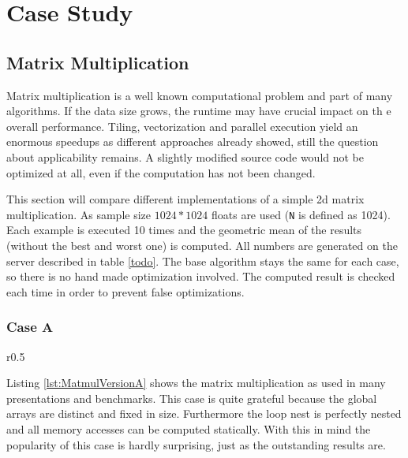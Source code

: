 
\chapter{Case Study} %
\label{Chapter6}


\section{Matrix Multiplication}
\label{MatrixMultiplication}
Matrix multiplication is a well known computational problem and part of many 
algorithms. If the data size grows, the runtime may have crucial impact on th
e overall performance. Tiling, vectorization and parallel execution yield an
enormous speedups as different approaches already
showed\cite{grosser:thesis, JIMBOREAN-2012-664345},
still the question about applicability remains. A slightly modified source code 
would not be optimized at all, even if the computation has not been changed. 

This section will compare different implementations of a simple 2d
matrix multiplication. As sample size  $1024*1024$ floats are used 
(\texttt{N} is defined as 1024).
Each example is executed 10 times and the geometric mean of the results 
(without the best and worst one) is computed. All numbers are generated on 
the server described in table \ref{todo}. The base algorithm stays the same 
for each case, so there is no hand made optimization involved. The computed 
result is checked each time in order to prevent false optimizations.


\subsection{Case A}
\begin{wrapfigure}[]{r}{0.5\textwidth}
  \centering
    \begin{minipage}[c]{0.4\textwidth}
    \vspace*{-3mm}
    
    \end{minipage}
  \caption{Matmul case A}
   \label{lst:MatmulVersionA}
\end{wrapfigure}

Listing \ref{lst:MatmulVersionA} shows the matrix multiplication as used in 
many presentations and benchmarks. This case is quite grateful because the
global arrays are distinct and fixed in size. Furthermore the loop nest is
perfectly nested and all memory accesses can be computed statically.
With this in mind the popularity of this case is hardly surprising,
just as the outstanding results are.\\


